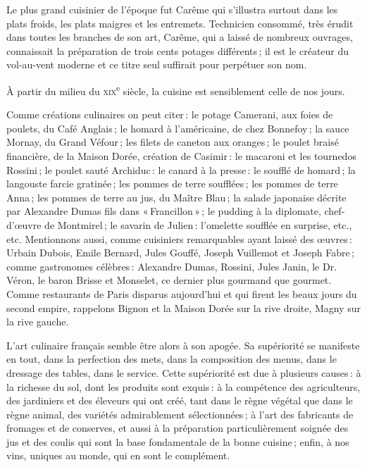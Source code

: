 Le plus grand cuisinier de l'époque fut Carême qui s'illustra surtout dans les
plats froids, les plats maigres et les entremets. Technicien consommé, très
érudit dans toutes les branches de son art, Carême, qui a laissé de nombreux
ouvrages, connaissait la préparation de trois cents potages différents ; il est
le créateur du vol-au-vent moderne et ce titre seul suffirait pour perpétuer
son nom.

À partir du milieu du \textsc{xix}\textsuperscript{e} siècle, la cuisine est
sensiblement celle de nos jours.

Comme créations culinaires on peut citer : le potage Camerani, aux foies de
poulets, du Café Anglais ; le homard à l'américaine, de chez Bonnefoy ; la
sauce Mornay, du Grand Véfour ; les filets de caneton aux oranges ; le poulet
braisé financière, de la Maison Dorée, création de Casimir : le macaroni et les
tournedos Rossini ; le poulet sauté Archiduc : le canard à la presse : le
soufflé de homard ; la langouste farcie gratinée ; les pommes de terre
soufflées ; les pommes de terre Anna ; les pommes de terre au jus, du Maître
Blau ; la salade japonaise décrite par Alexandre Dumas fils dans
« Francillon » ; le pudding à la diplomate, chef-d'œuvre de Montmirel ; le
savarin de Julien : l’omelette soufflée en surprise, etc., etc. Mentionnons
aussi, comme cuisiniers remarquables ayant laissé des œuvres : Urbain Dubois,
Emile Bernard, Jules Gouffé, Joseph Vuillemot et Joseph Fabre ; comme
gastronomes célèbres : Alexandre Dumas, Rossini, Jules Janin, le Dr. Véron, le
baron Brisse et Monselet, ce dernier plus gourmand que gourmet. Comme
restaurants de Paris disparus aujourd'hui et qui firent les beaux jours du
second empire, rappelons Bignon et la Maison Dorée sur la rive droite, Magny
sur la rive gauche.

L'art culinaire français semble être alors à son apogée. Sa supériorité se
manifeste en tout, dans la perfection des mets, dans la composition des menus,
dans le dressage des tables, dans le service. Cette supériorité est due
à plusieurs causes : à la richesse du sol, dont les produits sont exquis : à la
compétence des agriculteurs, des jardiniers et des éleveurs qui ont créé, tant
dans le règne végétal que dans le règne animal, des variétés admirablement
sélectionnées ; à l'art des fabricants de fromages et de conserves, et aussi
à la préparation particulièrement soignée des jus et des coulis qui sont la
base fondamentale de la bonne cuisine ; enfin, à nos vins, uniques au monde,
qui en sont le complément.

